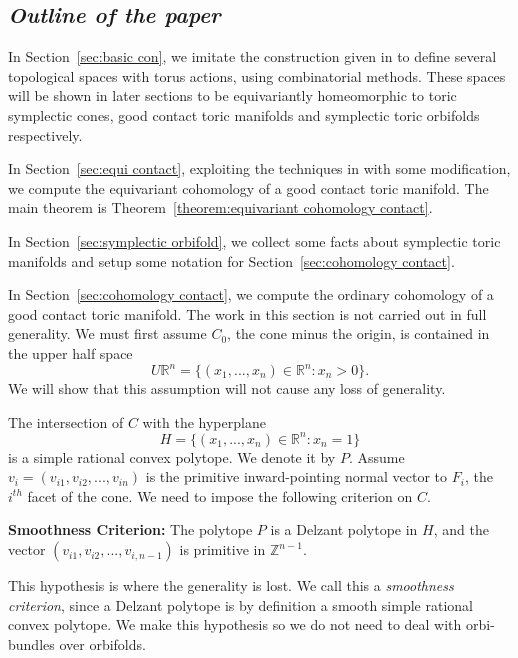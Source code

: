 \documentclass[12pt]{amsart}
\def\Z {{\mathbb{Z}}}
\def\R {{\mathbb{R}}}
\theoremstyle{definition}
\numberwithin{equation}{section}
\begin{document}
\subsection{\it Outline of the paper}

In Section~\ref{sec:basic con}, we imitate the construction given in
\cite{DJ} to define several topological spaces with torus actions,
using combinatorial methods. These spaces will be shown in later
sections to be equivariantly homeomorphic to toric symplectic cones,
good contact toric manifolds and symplectic toric orbifolds
respectively.

In Section~\ref{sec:equi contact}, exploiting the techniques in
\cite{DJ} with some modification, we compute the equivariant
cohomology of a good contact toric manifold. The main theorem is
Theorem~\ref{theorem:equivariant cohomology contact}.

In Section~\ref{sec:symplectic orbifold}, we collect some facts
about symplectic toric manifolds and setup some notation for
Section~\ref{sec:cohomology contact}.

In Section~\ref{sec:cohomology contact}, we compute the ordinary
cohomology of a good contact toric manifold. The work in this
section is not carried out in full generality. We must first assume
$C_{0}$, the cone minus the origin, is contained in the upper half
space
\begin{equation}
U\R^n = \{(x_{1},...,x_{n})\in \R^n : x_{n}>0\}.
\end{equation}
We will show that this assumption will not cause any loss of
generality.

The intersection of $C$ with the hyperplane
\begin{equation}
H = \{(x_{1},...,x_{n})\in \R^n : x_{n}=1\}
\end{equation}
is a simple rational convex polytope. We denote it by $P$. Assume
$v_{i}=(v_{i1},v_{i2},...,v_{in})$ is the primitive inward-pointing
normal vector to  $F_{i}$, the $i^{th}$ facet of the cone. We need
to impose the following criterion on $C$.

{\bf Smoothness Criterion:} The polytope $P$ is a Delzant polytope
in $H$, and the vector $(v_{i1},v_{i2},...,v_{i,n-1})$ is primitive
in $\Z^{n-1}$.

  This hypothesis is where the
generality is lost. We call this a {\em smoothness criterion}, since
a Delzant polytope is by definition a smooth simple rational convex
polytope. We make this hypothesis so we do not need to deal with
orbi-bundles over orbifolds.
\end{document}

